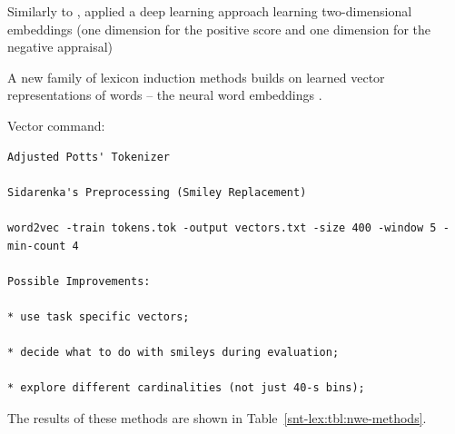 \citet{Tang:14}

\citet{Tang:14a}

Similarly to \citet{Severyn:15a}, \citet{Vo:16} applied a deep
learning approach learning two-dimensional embeddings (one dimension
for the positive score and one dimension for the negative appraisal)

\citet{Ren:16}

A new family of lexicon induction methods builds on learned vector
representations of words -- the neural word embeddings
\cite{Mikolov:13}.

Vector command:
\begin{verbatim}
Adjusted Potts' Tokenizer

Sidarenka's Preprocessing (Smiley Replacement)

word2vec -train tokens.tok -output vectors.txt -size 400 -window 5 -min-count 4

Possible Improvements:

* use task specific vectors;

* decide what to do with smileys during evaluation;

* explore different cardinalities (not just 40-s bins);
\end{verbatim}


The results of these methods are shown in Table~\ref{snt-lex:tbl:nwe-methods}.

